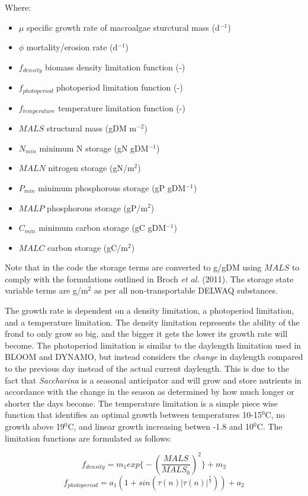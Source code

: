 \documentclass{article}
\begin{document}
Where:
\begin{itemize}
\item $\mu$ specific growth rate of macroalgae sturctural mass (d$^{-1}$)
\item $\phi$ mortality/erosion rate (d$^{-1}$)
\item $f_{density}$ biomass density limitation function (-)
\item $f_{photoperiod}$ photoperiod limitation function (-)
\item $f_{temperature}$ temperature limitation function (-)
\item $MALS$ structural mass (gDM m$^{-2}$)
\item $N_{min}$ minimum N storage (gN gDM$^{-1}$)
\item $MALN$ nitrogen storage (gN/m$^2$)
\item $P_{min}$ minimum phosphorous storage (gP gDM$^{-1}$)
\item $MALP$ phosphorous storage (gP/m$^2$)
\item $C_{min}$ minimum carbon storage (gC gDM$^{-1}$)
\item $MALC$ carbon storage (gC/m$^2$)
\end{itemize}

Note that in the code the storage terms are converted to g/gDM using $MALS$ to comply with the formulations outlined in Broch \textit{et al.} (2011). The storage state variable terms are g/m$^2$ as per all non-transportable DELWAQ substances.

The growth rate is dependent on a density limitation, a photoperiod limitation, and a temperature limitation. The density limitation represents the ability of the frond to only grow so big, and the bigger it gets the lower its growth rate will become. The photoperiod limitation is similar to the daylength limitation used in BLOOM and DYNAMO, but instead considers the \textit{change} in daylength compared to the previous day instead of the actual current daylength. This is due to the fact that \textit{Saccharina} is a seasonal anticipator and will grow and store nutrients in accordance with the change in the season as determined by how much longer or shorter the days become. The temperature limitation is a simple piece wise function that identifies an optimal growth between temperatures 10-15$^0$C, no growth above 19$^0$C, and linear growth increasing betwen -1.8 and 10$^0$C.  The limitation functions are formulated as follows:

\[f_{density} = m_1 exp\big\{-(\frac{MALS}{MALS_0})^2 \big\}+m_2\]
\[f_{photoperiod} = a_1 (1+sin(\tau (n) | \tau (n)| ^{\frac{1}{2}})) + a_2\]
\end{document}
